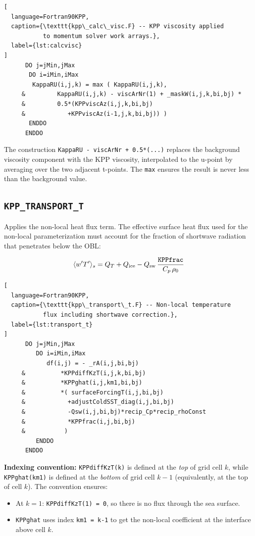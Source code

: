 \documentclass[12pt,letterpaper]{article}
\begin{document}
\begin{lstlisting}[  
  language=Fortran90KPP,  
  caption={\texttt{kpp\_calc\_visc.F} -- KPP viscosity applied  
           to momentum solver work arrays.},  
  label={lst:calcvisc}  
]  
      DO j=jMin,jMax  
       DO i=iMin,iMax  
        KappaRU(i,j,k) = max ( KappaRU(i,j,k),  
     &         KappaRU(i,j,k) - viscArNr(1) + _maskW(i,j,k,bi,bj) *  
     &         0.5*(KPPviscAz(i,j,k,bi,bj)  
     &            +KPPviscAz(i-1,j,k,bi,bj)) )  
       ENDDO  
      ENDDO  
\end{lstlisting}  
  
The construction \texttt{KappaRU - viscArNr + 0.5*(...)} replaces the  
background viscosity component with the KPP viscosity, interpolated  
to the u-point by averaging over the two adjacent t-points. The  
\texttt{max} ensures the result is never less than the background value.  
  
\subsection{\texttt{KPP\_TRANSPORT\_T}}  
  
Applies the non-local heat flux term. The effective surface heat flux  
used for the non-local parameterization must account for the fraction  
of shortwave radiation that penetrates below the OBL:  
  
\begin{equation}  
\langle w'T'\rangle_s = Q_T + Q_{\rm ice} - Q_{\rm sw}\,  
\frac{\texttt{KPPfrac}}{C_p\,\rho_0}  
\end{equation}  
  
\begin{lstlisting}[  
  language=Fortran90KPP,  
  caption={\texttt{kpp\_transport\_t.F} -- Non-local temperature  
           flux including shortwave correction.},  
  label={lst:transport_t}  
]  
      DO j=jMin,jMax  
         DO i=iMin,iMax  
            df(i,j) = - _rA(i,j,bi,bj)  
     &          *KPPdiffKzT(i,j,k,bi,bj)  
     &          *KPPghat(i,j,km1,bi,bj)  
     &          *( surfaceForcingT(i,j,bi,bj)  
     &            +adjustColdSST_diag(i,j,bi,bj)  
     &            -Qsw(i,j,bi,bj)*recip_Cp*recip_rhoConst  
     &            *KPPfrac(i,j,bi,bj)  
     &           )  
         ENDDO  
      ENDDO  
\end{lstlisting}  
  
\begin{infobox}  
\textbf{Indexing convention:} \texttt{KPPdiffKzT(k)} is defined at the  
\textit{top} of grid cell $k$, while \texttt{KPPghat(km1)} is defined  
at the \textit{bottom} of grid cell $k-1$ (equivalently, at the top of  
cell $k$). The convention ensures:  
\begin{itemize}  
  \item At $k=1$: \texttt{KPPdiffKzT(1) = 0}, so there is no flux  
        through the sea surface.  
  \item \texttt{KPPghat} uses index \texttt{km1 = k-1} to get the  
        non-local coefficient at the interface above cell $k$.  
\end{itemize}  
\end{infobox}  
  
\end{document}
